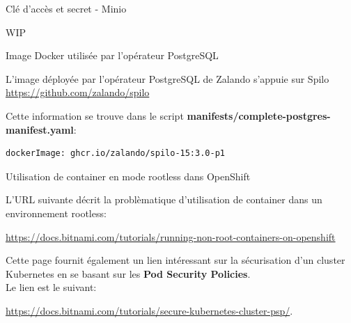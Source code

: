 
\begin{frame}[fragile]{Clé d'accès et secret - Minio}

   WIP

\end{frame}


\begin{frame}[fragile]{Image Docker utilisée par l'opérateur PostgreSQL}

   L'image déployée par l'opérateur PostgreSQL de Zalando s'appuie sur Spilo 
\url{https://github.com/zalando/spilo}

   Cette information se trouve dans le script \textbf{manifests/complete-postgres-manifest.yaml}:
\begin{Verbatim}[commandchars=\&\#\#]
  dockerImage: ghcr.io/zalando/spilo-15:3.0-p1
\end{Verbatim}

\end{frame}


\begin{frame}[shrink=7,fragile]{Utilisation de container en mode rootless dans OpenShift}

   L'URL suivante décrit la problèmatique d'utilisation de container dans un environnement rootless: \\
   \begin{tiny}
   \url{https://docs.bitnami.com/tutorials/running-non-root-containers-on-openshift} \\
   \end{tiny}
   Cette page fournit également un lien intéressant sur la sécurisation d'un cluster Kubernetes en se basant sur les \textbf{Pod Security Policies}.\\
   Le lien est le suivant: \\
   \begin{tiny}
   \url{https://docs.bitnami.com/tutorials/secure-kubernetes-cluster-psp/}.
   \end{tiny}

\end{frame}


